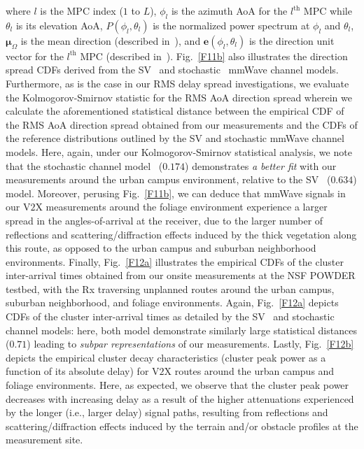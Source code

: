 \documentclass[10pt, twocolumn]{IEEEtran}
\begin{document}
{where $l$ is the MPC index ($1$ to $L$), $\phi_{l}$ is the azimuth AoA for the $l^{\mathrm{th}}$ MPC while $\theta_{l}$ is its elevation AoA, $P(\phi_{l}, \theta_{l})$ is the normalized power spectrum at $\phi_{l}$ and $\theta_{l}$, $\boldsymbol{\mu}_{\Omega}$ is the mean direction (described in~\cite{Indoor60G}), and $\mathbf{e}(\phi_{l}, \theta_{l})$ is the direction unit vector for the $l^{\mathrm{th}}$ MPC (described in~\cite{Indoor60G}). Fig.~\ref{F11b} also illustrates the direction spread CDFs derived from the SV~\cite{SV_Molisch} and stochastic~\cite{Indoor60G} mmWave channel models. Furthermore, as is the case in our RMS delay spread investigations, we evaluate the Kolmogorov-Smirnov statistic for the RMS AoA direction spread wherein we calculate the aforementioned statistical distance between the empirical CDF of the RMS AoA direction spread obtained from our measurements and the CDFs of the reference distributions outlined by the SV and stochastic mmWave channel models. Here, again, under our Kolmogorov-Smirnov statistical analysis, we note that the stochastic channel model~\cite{Indoor60G} ($0.174$) demonstrates \emph{a better fit} with our measurements around the urban campus environment, relative to the SV~\cite{SV_Molisch} ($0.634$) model. Moreover, perusing Fig.~\ref{F11b}, we can deduce that mmWave signals in our V$2$X measurements around the foliage environment experience a larger spread in the angles-of-arrival at the receiver, due to the larger number of reflections and scattering/diffraction effects induced by the thick vegetation along this route, as opposed to the urban campus and suburban neighborhood environments. Finally, Fig.~\ref{F12a} illustrates the empirical CDFs of the cluster inter-arrival times obtained from our onsite measurements at the NSF POWDER testbed, with the Rx traversing unplanned routes around the urban campus, suburban neighborhood, and foliage environments. Again, Fig.~\ref{F12a} depicts CDFs of the cluster inter-arrival times as detailed by the SV~\cite{SV_Molisch} and stochastic~\cite{Indoor60G} channel models: here, both model demonstrate similarly large statistical distances ($0.71$) leading to \emph{subpar representations} of our measurements. Lastly, Fig.~\ref{F12b} depicts the empirical cluster decay characteristics (cluster peak power as a function of its absolute delay) for V$2$X routes around the urban campus and foliage environments. Here, as expected, we observe that the cluster peak power decreases with increasing delay as a result of the higher attenuations experienced by the longer (i.e., larger delay) signal paths, resulting from reflections and scattering/diffraction effects induced by the terrain and/or obstacle profiles at the measurement site.
\vspace{-3mm}

}
\end{document}
